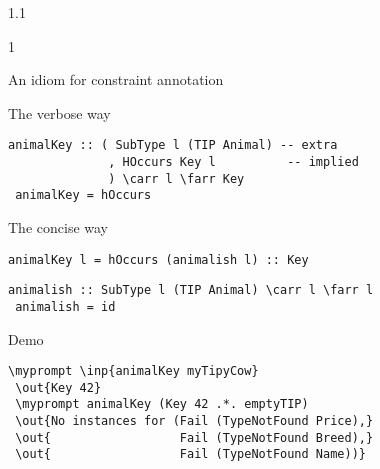 \documentclass{slides}
\newenvironment{myslide}{\begin{slide}\color{Blue}\begin{boxedminipage}{1.1\hsize}\begin{boxedminipage}{1\hsize}\color{Black}
\vspace{-170\in}
}{%
\smallskip
\end{boxedminipage}
\end{boxedminipage}
\end{slide}}
\newenvironment{myslide}{\begin{slide}
}{%
\end{slide}}
\newenvironment{myslide}{\begin{slide}\color{White}\begin{boxedminipage}{1.1\hsize}\color{Black}
\vspace{-170\in}
}{%
\smallskip
\end{boxedminipage}
\end{slide}}
\newcommand{\header}[1]{{\large \color{Red} #1}}
\newcommand{\inp}[1]{{\color{Brown} \mytextbf{#1}}}
\newcommand{\out}[1]{{\color{Black} \mytextbf{#1}}}
\newcommand{\blau}[1]{{\vspace{-50\in}\normalsize \color{Blue} #1}}
\newcommand{\farr}{\ensuremath{\to}}
\newcommand{\carr}{\ensuremath{\Rightarrow}}
\newcommand{\myprompt}{ghci\ensuremath{>}}
\newcommand{\mytextbf}[1]{\texttt{\textbf{#1}}}
\begin{document}
\begin{myslide}

\header{An idiom for constraint annotation}

\vspace{-77\in}

\blau{The verbose way}

\smallskip

\begin{Verbatim}[fontfamily=courier,fontsize=\small,commandchars=\\\{\}]
 animalKey :: ( SubType l (TIP Animal) -- extra
              , HOccurs Key l          -- implied
              ) \carr l \farr Key
 animalKey = hOccurs
\end{Verbatim}

\vspace{-77\in}

\blau{The concise way}

\smallskip

\begin{Verbatim}[fontfamily=courier,fontsize=\small,commandchars=\\\{\}]
 animalKey l = hOccurs (animalish l) :: Key
\end{Verbatim}

\smallskip

\begin{Verbatim}[fontfamily=courier,fontsize=\small,commandchars=\\\{\}]
 animalish :: SubType l (TIP Animal) \carr l \farr l
 animalish = id
\end{Verbatim}

\vspace{-77\in}

\blau{Demo}

\smallskip

\begin{Verbatim}[fontfamily=courier,fontsize=\tiny,commandchars=\\\{\}]
 \myprompt \inp{animalKey myTipyCow}
 \out{Key 42}
 \myprompt animalKey (Key 42 .*. emptyTIP)
 \out{No instances for (Fail (TypeNotFound Price),}
 \out{                  Fail (TypeNotFound Breed),}
 \out{                  Fail (TypeNotFound Name))}
\end{Verbatim}

\end{myslide}



\end{document}
